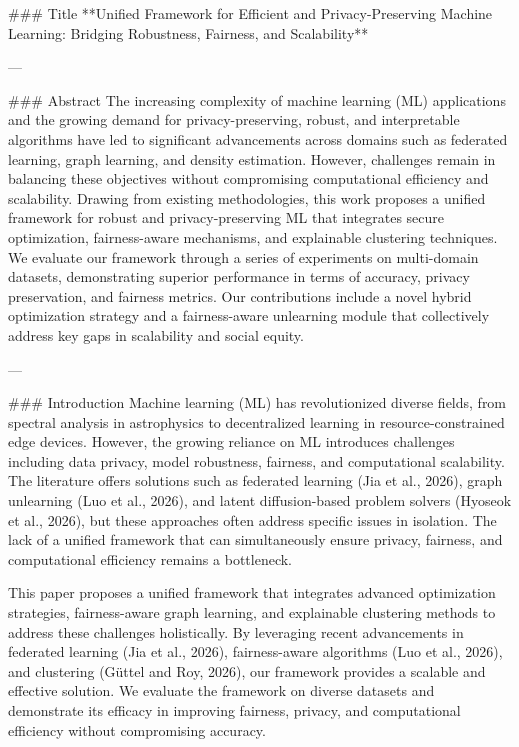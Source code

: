 ### Title  
**Unified Framework for Efficient and Privacy-Preserving Machine Learning: Bridging Robustness, Fairness, and Scalability**

---

### Abstract  
The increasing complexity of machine learning (ML) applications and the growing demand for privacy-preserving, robust, and interpretable algorithms have led to significant advancements across domains such as federated learning, graph learning, and density estimation. However, challenges remain in balancing these objectives without compromising computational efficiency and scalability. Drawing from existing methodologies, this work proposes a unified framework for robust and privacy-preserving ML that integrates secure optimization, fairness-aware mechanisms, and explainable clustering techniques. We evaluate our framework through a series of experiments on multi-domain datasets, demonstrating superior performance in terms of accuracy, privacy preservation, and fairness metrics. Our contributions include a novel hybrid optimization strategy and a fairness-aware unlearning module that collectively address key gaps in scalability and social equity.  

---

### Introduction  
Machine learning (ML) has revolutionized diverse fields, from spectral analysis in astrophysics to decentralized learning in resource-constrained edge devices. However, the growing reliance on ML introduces challenges including data privacy, model robustness, fairness, and computational scalability. The literature offers solutions such as federated learning (Jia et al., 2026), graph unlearning (Luo et al., 2026), and latent diffusion-based problem solvers (Hyoseok et al., 2026), but these approaches often address specific issues in isolation. The lack of a unified framework that can simultaneously ensure privacy, fairness, and computational efficiency remains a bottleneck.  

This paper proposes a unified framework that integrates advanced optimization strategies, fairness-aware graph learning, and explainable clustering methods to address these challenges holistically. By leveraging recent advancements in federated learning (Jia et al., 2026), fairness-aware algorithms (Luo et al., 2026), and clustering (Güttel and Roy, 2026), our framework provides a scalable and effective solution. We evaluate the framework on diverse datasets and demonstrate its efficacy in improving fairness, privacy, and computational efficiency without compromising accuracy.

